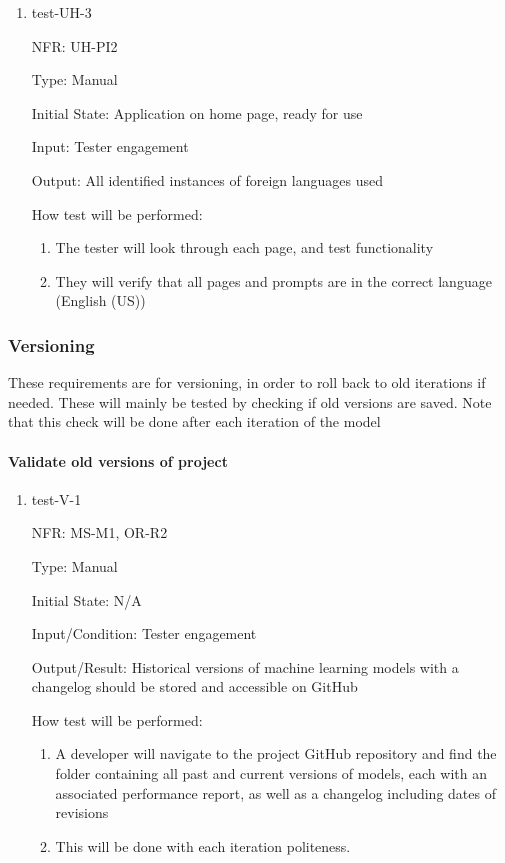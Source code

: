 \documentclass[12pt, titlepage]{article}
\begin{document}
\begin{enumerate}
  \item{test-UH-3}
  
  NFR: UH-PI2

  Type: Manual
            
  Initial State: Application on home page, ready for use
            
  Input: Tester engagement
            
  Output: All identified instances of foreign languages used
            
  How test will be performed: 
  \begin{enumerate}
    \item The tester will look through each page, and test functionality
    \item They will verify that all pages and prompts are in the correct language (English (US))
  \end{enumerate}
  
  \end{enumerate}

\subsubsection{Versioning}
These requirements are for versioning, in order to roll back to old iterations
if needed. These will mainly be tested by checking if old versions are saved.
Note that this check will be done after each iteration of the model

\paragraph{Validate old versions of project}
\begin{enumerate}
  \item{test-V-1}

  NFR: MS-M1, OR-R2
  
  Type: Manual
            
  Initial State: N/A
            
  Input/Condition: Tester engagement
            
  Output/Result: Historical versions of machine learning models with a changelog should be stored and accessible on GitHub
            
  How test will be performed: 
  \begin{enumerate}
    \item A developer will navigate to the project GitHub repository and find the folder containing all past and current versions of models, each with an associated performance report, as well as a changelog including dates of revisions
    \item This will be done with each iteration
    politeness.
  \end{enumerate}
\end{enumerate}
\end{document}

